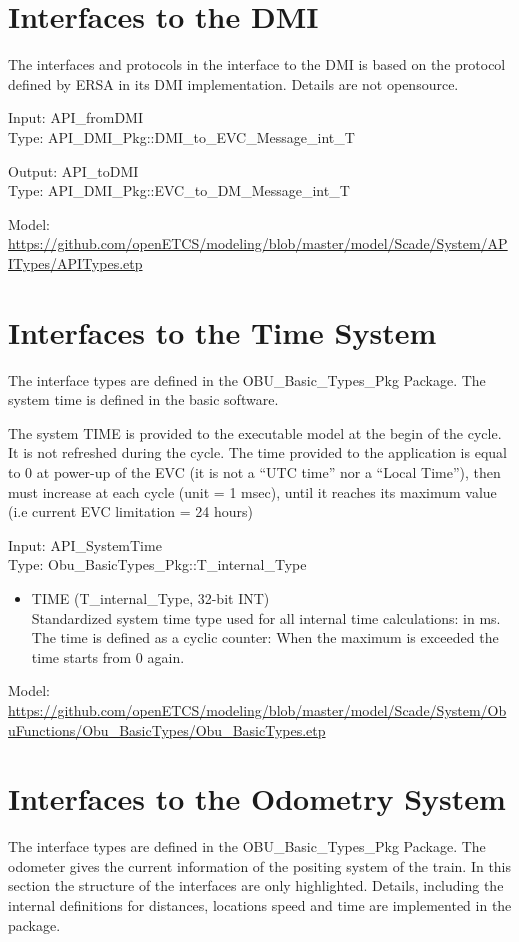 \documentclass{template/openetcs_report}
\begin{document}
\section{Interfaces to the DMI}

The interfaces and protocols in the interface to the DMI is based on the protocol defined by ERSA in its DMI implementation. Details are not opensource.

Input: API\_fromDMI\\
Type: API\_DMI\_Pkg::DMI\_to\_EVC\_Message\_int\_T

Output: API\_toDMI\\
Type: API\_DMI\_Pkg::EVC\_to\_DM\_Message\_int\_T

Model: \url{https://github.com/openETCS/modeling/blob/master/model/Scade/System/APITypes/APITypes.etp}

\section{Interfaces to the Time System}
The interface types are defined in the OBU\_Basic\_Types\_Pkg Package. The system time is defined in the basic software.

The system TIME is provided to the executable model at the begin of the cycle. It is not refreshed during the cycle. The time provided to the application is equal to 0 at power-up of the EVC (it is not a “UTC time” nor a “Local
Time”), then must increase at each cycle (unit = 1 msec), until it reaches its maximum value (i.e current EVC
limitation = 24 hours)

Input: API\_SystemTime\\
Type: Obu\_BasicTypes\_Pkg::T\_internal\_Type

\begin{itemize}
\item TIME (T\_internal\_Type, 32-bit INT)\\
Standardized system time type used for all internal time calculations: in ms. The time is defined as a cyclic counter: When the maximum is exceeded the time starts from 0 again. 
\end{itemize}

Model: \url{https://github.com/openETCS/modeling/blob/master/model/Scade/System/ObuFunctions/Obu_BasicTypes/Obu_BasicTypes.etp}

\section{Interfaces to the Odometry System}
The interface types are defined in the OBU\_Basic\_Types\_Pkg Package. 
The odometer gives the current information of the positing system of the train. In this section the structure of the interfaces are only highlighted. Details, including the internal definitions for distances, locations speed and time are implemented in the package. 
\end{document}
